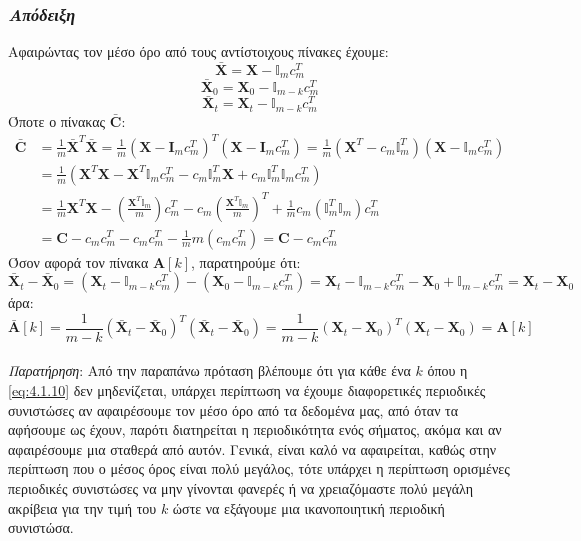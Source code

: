 \subsubsection*{\small{\textit{Απόδειξη}}}
Αφαιρώντας τον μέσο όρο από τους αντίστοιχους πίνακες έχουμε:
$$
\mathbf{\bar{X}} = \mathbf{X} - \mathbb{I}_{m} c_m^T
$$
$$
\mathbf{\bar{X}}_0 = \mathbf{X}_0 - \mathbb{I}_{m-k} c_m^T
$$
$$
\mathbf{\bar{X}}_t = \mathbf{X}_t - \mathbb{I}_{m-k} c_m^T
$$
Όποτε ο πίνακας $\mathbf{\bar{C}}$:
\begin{align*}
\mathbf{\bar{C}} &= \frac{1}{m} \mathbf{\bar{X}}^T \mathbf{\bar{X}} =
\frac{1}{m} \left ( \mathbf{X} - \mathbf{I}_m c_m^T \right)^T 
\left ( \mathbf{X} - \mathbf{I}_m c_m^T \right) = 
\frac{1}{m} \left ( \mathbf{X}^T - c_m \mathbb{I}_m^T \right )
\left ( \mathbf{X} - \mathbb{I}_m c_m^T  \right ) \\
& = \frac{1}{m} \left (  \mathbf{X}^T \mathbf{X} - \mathbf{X}^T \mathbb{I}_m c_m^T - c_m \mathbb{I}_m^T \mathbf{X} + c_m \mathbb{I}_m^T \mathbb{I}_m c_m^T  \right ) \\
&= \frac{1}{m} \mathbf{X}^T \mathbf{X} -
\left ( \frac{\mathbf{X}^T \mathbb{I}_m}{m} \right ) c_m^T -
c_m \left ( \frac{\mathbf{X}^T \mathbb{I}_m}{m} \right )^T +
\frac{1}{m} c_m \left ( \mathbb{I}_m^T \mathbb{I}_m \right ) c_m^T \\
&= \mathbf{C} - c_m c_m^T - c_m c_m^T - \frac{1}{m} m \left ( c_m  c_m^T \right ) = \mathbf{C} - c_m c_m^T
\end{align*}
Όσον αφορά τον πίνακα $\mathbf{A}[k]$, παρατηρούμε ότι:
$$
\mathbf{\bar{X}}_t - \mathbf{\bar{X}}_0 = \left ( \mathbf{X}_t - \mathbb{I}_{m-k} c_m^T \right ) - \left ( \mathbf{X}_0 - \mathbb{I}_{m-k} c_m^T \right ) = \mathbf{X}_t - \mathbb{I}_{m-k} c_m^T
- \mathbf{X}_0 + \mathbb{I}_{m-k} c_m^T = \mathbf{X}_t - \mathbf{X}_0
$$
άρα:
$$
\mathbf{\bar{A}}[k] = \frac{1}{m-k} \left ( \mathbf{\bar{X}}_t - \mathbf{\bar{X}}_0 \right )^T \left ( \mathbf{\bar{X}}_t - \mathbf{\bar{X}}_0 \right ) = \frac{1}{m-k} \left ( \mathbf{X}_t - \mathbf{X}_0 \right )^T \left ( \mathbf{X}_t - \mathbf{X}_0 \right ) = \mathbf{A}[k]
$$
\\
\textit{Παρατήρηση}: Από την παραπάνω πρόταση βλέπουμε ότι για κάθε ένα $k$ όπου η \eqref{eq:4.1.10} δεν μηδενίζεται, υπάρχει περίπτωση να έχουμε διαφορετικές περιοδικές συνιστώσες αν αφαιρέσουμε τον μέσο όρο από τα δεδομένα μας, από όταν τα αφήσουμε ως έχουν, παρότι διατηρείται η περιοδικότητα ενός σήματος, ακόμα και αν αφαιρέσουμε μια σταθερά από αυτόν. Γενικά, είναι καλό να αφαιρείται, καθώς στην περίπτωση που ο μέσος όρος είναι πολύ μεγάλος, τότε υπάρχει η περίπτωση ορισμένες περιοδικές συνιστώσες να μην γίνονται φανερές ή να χρειαζόμαστε πολύ μεγάλη ακρίβεια για την τιμή του $k$ ώστε να εξάγουμε μια ικανοποιητική περιοδική συνιστώσα.
